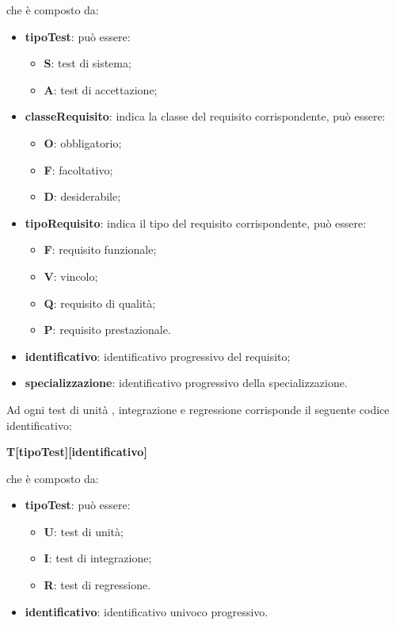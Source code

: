 	che è composto da:
	\begin{itemize}
	    \item \textbf{tipoTest}: può essere:
	    \begin{itemize}
	        \item \textbf{S}: test di sistema;
	        \item \textbf{A}: test di accettazione;
	    \end{itemize}
	    \item \textbf{classeRequisito}: indica la classe del requisito corrispondente, può essere:
	        \begin{itemize}
	            \item \textbf{O}: obbligatorio;
	            \item \textbf{F}: facoltativo;
	            \item \textbf{D}: desiderabile;
	        \end{itemize}
	   \item \textbf{tipoRequisito}: indica il tipo del requisito corrispondente, può essere:
	        \begin{itemize}
	            \item \textbf{F}: requisito funzionale;
	            \item \textbf{V}: vincolo;
	            \item \textbf{Q}: requisito di qualità;
	            \item \textbf{P}: requisito prestazionale. 
	        \end{itemize}
	  \item \textbf{identificativo}: identificativo progressivo del requisito;
	  \item \textbf{specializzazione}: identificativo progressivo della specializzazione.
	\end{itemize}
	Ad ogni test di unità , integrazione e regressione corrisponde il seguente codice identificativo:\\
	
	\centerline{\textbf{T[tipoTest][identificativo]}}
	
	che è composto da:
	\begin{itemize}
	    \item \textbf{tipoTest}: può essere:
	    \begin{itemize}
	        \item \textbf{U}: test di unità;
	        \item \textbf{I}: test di integrazione;
	        \item \textbf{R}: test di regressione.
	    \end{itemize}
	  \item \textbf{identificativo}: identificativo univoco progressivo.
	\end{itemize}
